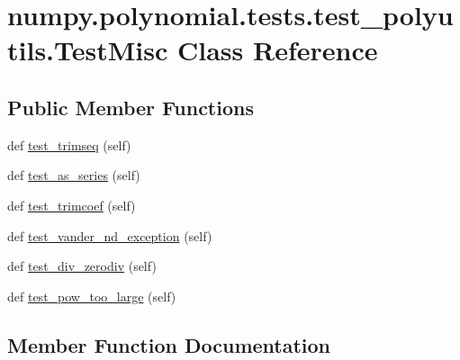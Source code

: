 \hypertarget{classnumpy_1_1polynomial_1_1tests_1_1test__polyutils_1_1TestMisc}{}\section{numpy.\+polynomial.\+tests.\+test\+\_\+polyutils.\+Test\+Misc Class Reference}
\label{classnumpy_1_1polynomial_1_1tests_1_1test__polyutils_1_1TestMisc}
\subsection*{Public Member Functions}
\begin{DoxyCompactItemize}
\item 
def \hyperlink{classnumpy_1_1polynomial_1_1tests_1_1test__polyutils_1_1TestMisc_aeea61539961abee05bec890b5992716c}{test\+\_\+trimseq} (self)
\item 
def \hyperlink{classnumpy_1_1polynomial_1_1tests_1_1test__polyutils_1_1TestMisc_aa7a488a729538f79b0005efae9d493cc}{test\+\_\+as\+\_\+series} (self)
\item 
def \hyperlink{classnumpy_1_1polynomial_1_1tests_1_1test__polyutils_1_1TestMisc_aa39185c21f7e87e88a929e058558394a}{test\+\_\+trimcoef} (self)
\item 
def \hyperlink{classnumpy_1_1polynomial_1_1tests_1_1test__polyutils_1_1TestMisc_ac4f3d788495c72b3581c079a61a6acda}{test\+\_\+vander\+\_\+nd\+\_\+exception} (self)
\item 
def \hyperlink{classnumpy_1_1polynomial_1_1tests_1_1test__polyutils_1_1TestMisc_a43f9666b5c4e618b84248ab5eb04741c}{test\+\_\+div\+\_\+zerodiv} (self)
\item 
def \hyperlink{classnumpy_1_1polynomial_1_1tests_1_1test__polyutils_1_1TestMisc_a717f3b1ad35e4cdb1f367bd30ba2f5cf}{test\+\_\+pow\+\_\+too\+\_\+large} (self)
\end{DoxyCompactItemize}


\subsection{Member Function Documentation}
\mbox{\label{classnumpy_1_1polynomial_1_1tests_1_1test__polyutils_1_1TestMisc_aa7a488a729538f79b0005efae9d493cc}} 
